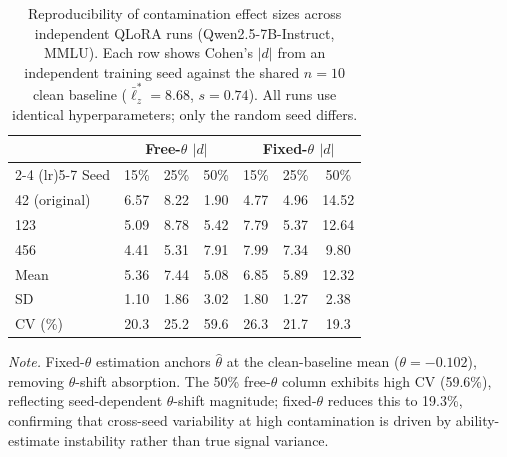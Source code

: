 \begin{table}[h]
\centering
\caption{Reproducibility of contamination effect sizes across independent QLoRA runs (Qwen2.5-7B-Instruct, MMLU). Each row shows Cohen's $|d|$ from an independent training seed against the shared $n{=}10$ clean baseline ($\bar{\ell}_z^* = 8.68$, $s = 0.74$). All runs use identical hyperparameters; only the random seed differs.}
\footnotesize
\begin{tabular}{@{}lcccccc@{}}
\toprule
& \multicolumn{3}{c}{Free-$\theta$ $|d|$} & \multicolumn{3}{c}{Fixed-$\theta$ $|d|$} \\
\cmidrule(lr){2-4} \cmidrule(lr){5-7}
Seed & 15\% & 25\% & 50\% & 15\% & 25\% & 50\% \\
\midrule
42 (original) & 6.57 & 8.22 & 1.90 & 4.77 & 4.96 & 14.52 \\
123 & 5.09 & 8.78 & 5.42 & 7.79 & 5.37 & 12.64 \\
456 & 4.41 & 5.31 & 7.91 & 7.99 & 7.34 & 9.80 \\
\addlinespace
Mean & 5.36 & 7.44 & 5.08 & 6.85 & 5.89 & 12.32 \\
SD & 1.10 & 1.86 & 3.02 & 1.80 & 1.27 & 2.38 \\
CV (\%) & 20.3 & 25.2 & 59.6 & 26.3 & 21.7 & 19.3 \\
\bottomrule
\end{tabular}
\vspace{0.5em}

\noindent\textit{Note.} Fixed-$\theta$ estimation anchors $\hat{\theta}$ at the clean-baseline mean ($\theta{=}{-}0.102$), removing $\theta$-shift absorption. The 50\% free-$\theta$ column exhibits high CV (59.6\%), reflecting seed-dependent $\theta$-shift magnitude; fixed-$\theta$ reduces this to 19.3\%, confirming that cross-seed variability at high contamination is driven by ability-estimate instability rather than true signal variance.
\end{table}

